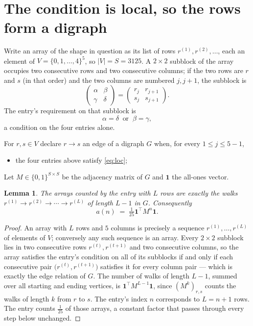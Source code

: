 \documentclass[11pt,a4paper]{article}
\theoremstyle{plain}
\newtheorem{lemma}[theorem]{Lemma}
\theoremstyle{definition}
\begin{document}
\section{The condition is local, so the rows form a digraph}

Write an array of the shape in question as its list of rows
$r^{(1)},r^{(2)},\dots$, each an element of
$V=\{0,1,\dots,4\}^{5}$, so $|V|=S=3125$. A $2\times2$ subblock of the array
occupies two consecutive rows and two consecutive columns; if the two rows are $r$
and $s$ (in that order) and the two columns are numbered $j,j+1$,
the subblock is
\[
\begin{pmatrix}\alpha&\beta\\\gamma&\delta\end{pmatrix}=\begin{pmatrix}r_j&r_{j+1}\\s_j&s_{j+1}\end{pmatrix}.
\]
The entry's requirement on that subblock is
\begin{equation}\label{eq:loc}
\alpha=\delta\ \text{ or }\ \beta=\gamma,
\end{equation}
a condition on the four entries alone.

For $r,s\in V$ declare $r\to s$ an edge of a digraph $G$ when, for every
$1\le j\le 5-1$,
\begin{itemize}
\item the four entries above satisfy \eqref{eq:loc};

\end{itemize}
Let $M\in\{0,1\}^{S\times S}$ be the adjacency matrix of $G$ and $\mathbf{1}$ the
all-ones vector.

\begin{lemma}\label{lem:walk}
The arrays counted by the entry with $L$ rows are exactly the walks
$r^{(1)}\to r^{(2)}\to\cdots\to r^{(L)}$ of length $L-1$ in $G$. Consequently
\[
a(n)\;=\;\tfrac1{25}\mathbf{1}^{\!\top}M^{n}\mathbf{1} .
\]
\end{lemma}

\begin{proof}
An array with $L$ rows and $5$ columns is precisely a sequence
$r^{(1)},\dots,r^{(L)}$ of elements of $V$; conversely any such sequence is an array.
Every $2\times2$ subblock lies in two consecutive rows $r^{(t)},r^{(t+1)}$ and two
consecutive columns, so the array satisfies the entry's condition on all of its subblocks
if and only if each consecutive pair $\bigl(r^{(t)},r^{(t+1)}\bigr)$ satisfies it for
every column pair --- which is exactly the edge relation of $G$. The number of walks of
length $L-1$, summed over all starting and ending vertices, is
$\mathbf{1}^{\!\top}M^{L-1}\mathbf{1}$, since $(M^{k})_{r,s}$ counts the walks of
length $k$ from $r$ to $s$. The entry's index $n$ corresponds to $L=n+1$ rows. The entry counts $\tfrac1{25}$ of those arrays, a constant factor that passes through every step below unchanged.
\end{proof}
\end{document}
